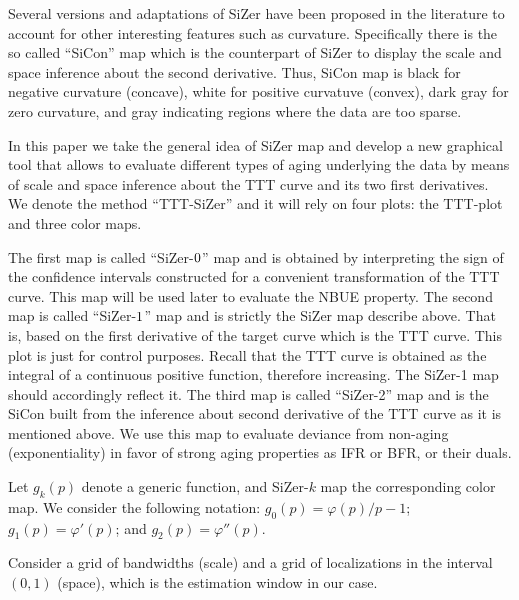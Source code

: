 \documentclass[preprint,12pt]{elsarticle}
\begin{document}
Several versions and adaptations of SiZer have been proposed in the literature to account for other interesting features such as curvature. Specifically there is the so called  ``SiCon'' map which is the counterpart of SiZer to display the scale and space inference about the second derivative. Thus, SiCon map is black for negative curvature (concave), white for positive curvatuve (convex), dark gray for zero curvature, and gray indicating regions where the data are too sparse. 

In this paper we take the general idea of SiZer map and develop a new graphical tool that allows to evaluate different types of aging underlying the data by means of scale and space inference about the TTT curve and its two first derivatives. We denote the method ``TTT-SiZer'' and it will rely on four plots: the TTT-plot and three color maps.


The first map is called ``SiZer-${\rm 0}$'' map and is obtained by interpreting the sign of the confidence intervals constructed for a convenient transformation of the TTT curve. This map will be used later to evaluate the NBUE property.
The second map is called ``SiZer-${\rm 1}$'' map and is strictly the SiZer map describe above. That is, based on the first derivative of the target curve which is the TTT curve. This plot is just for control purposes. Recall that the TTT curve is obtained as the integral of a continuous positive function, therefore increasing. The  SiZer-1 map should accordingly reflect it. 
The third map is called ``SiZer-{\rm 2}'' map and is the  SiCon  built from the inference about second derivative of the TTT curve as it is mentioned above. We use this map to evaluate deviance from non-aging (exponentiality) in favor of strong aging properties as IFR or BFR, or their duals.

Let $g_k(p)$ denote a generic function, and SiZer-${ k}$ map the corresponding color map. We consider the following notation: $g_0(p)=\varphi(p)/p-1$; $g_1(p)=\varphi'(p)$; and  $g_2(p)=\varphi''(p)$. 

Consider a grid of bandwidths (scale) and a grid of localizations in the interval $(0,1)$  (space), which is the estimation window in our case. 
\end{document}
